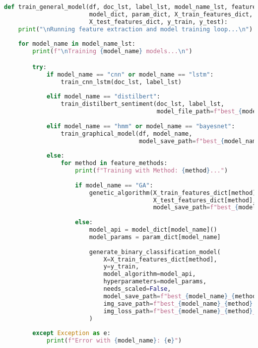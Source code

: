 \begin{lstlisting}[language=python,caption={Unified Training Pipeline},label={lst:train}]
def train_general_model(df, doc_lst, label_lst, model_name_lst, feature_methods, 
                        model_dict, param_dict, X_train_features_dict, 
                        X_test_features_dict, y_train, y_test):
    print("\nRunning feature extraction and model training loop...\n")
    
    for model_name in model_name_lst:
        print(f"\nTraining {model_name} models...\n")

        try:
            if model_name == "cnn" or model_name == "lstm":
                train_cnn_lstm(doc_lst, label_lst)
                
            elif model_name == "distilbert":
                train_distilbert_sentiment(doc_lst, label_lst, 
                                           model_file_path=f"best_{model_name}")
                
            elif model_name == "hmm" or model_name == "bayesnet":
                train_graphical_model(df, model_name, 
                                      model_save_path=f"best_{model_name}.pkl")
                
            else:
                for method in feature_methods:
                    print(f"Training with Method: {method}...")
                    
                    if model_name == "GA":
                        genetic_algorithm(X_train_features_dict[method], y_train,
                                          X_test_features_dict[method], y_test,
                                          model_save_path=f"best_{model_name}_{method}.pkl")
                    
                    else:
                        model_api = model_dict[model_name]()
                        model_params = param_dict[model_name]
                        
                        generate_binary_classification_model(
                            X=X_train_features_dict[method], 
                            y=y_train, 
                            model_algorithm=model_api, 
                            hyperparameters=model_params,
                            needs_scaled=False,
                            model_save_path=f"best_{model_name}_{method}.pkl",
                            img_save_path=f"best_{model_name}_{method}.png",
                            img_loss_path=f"best_{model_name}_{method}_loss.png"
                        )
                        
        except Exception as e:
            print(f"Error with {model_name}: {e}")
\end{lstlisting}

